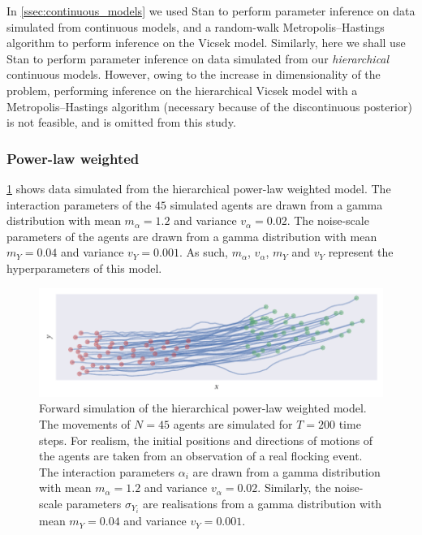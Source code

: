 In \cref{ssec:continuous_models} we used Stan to perform parameter inference on
data simulated from continuous models, and a random-walk Metropolis--Hastings
algorithm to perform inference on the Vicsek model. Similarly, here we shall
use Stan to perform parameter inference on data simulated from our
\emph{hierarchical} continuous models. However, owing to the increase in
dimensionality of the problem, performing inference on the hierarchical Vicsek
model with a Metropolis--Hastings algorithm (necessary because of the
discontinuous posterior) is not feasible, and is omitted from this study.

\subsubsection{Power-law weighted}

\cref{fig:power_hier_sim} shows data simulated from the hierarchical power-law
weighted model. The interaction parameters of the $45$ simulated agents are
drawn from a gamma distribution with mean $m_{\alpha}=1.2$ and variance
$v_{\alpha}=0.02$. The noise-scale parameters of the agents are drawn from a
gamma distribution with mean $m_Y=0.04$ and variance $v_Y=0.001$. As such,
$m_{\alpha}$, $v_{\alpha}$, $m_Y$ and $v_Y$ represent the hyperparameters of
this model.

\begin{figure}[tbp]
  \includegraphics{power_hier_sim.pdf}
  \caption{Forward simulation of the hierarchical power-law weighted model. The
    movements of $N=45$ agents are simulated for $T=200$ time steps. For
    realism, the initial positions and directions of motions of the agents
    are taken from an observation of a real flocking event. The interaction
    parameters $\alpha_i$ are drawn from a gamma distribution with mean
    $m_{\alpha}=1.2$ and variance $v_{\alpha}=0.02$. Similarly, the
    noise-scale parameters $\sigma_{Y_i}$ are realisations from a gamma
    distribution with mean $m_Y=0.04$ and variance $v_Y=0.001$.}
  \label{fig:power_hier_sim}
\end{figure}

